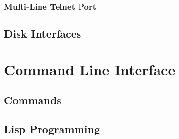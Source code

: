 \documentclass[10pt, openany]{book}
\begin{document}
\subsection{Multi-Line Telnet Port}
\section{Disk Interfaces}

\chapter{Command Line Interface}

\section{Commands}

\section{Lisp Programming}
\end{document}
